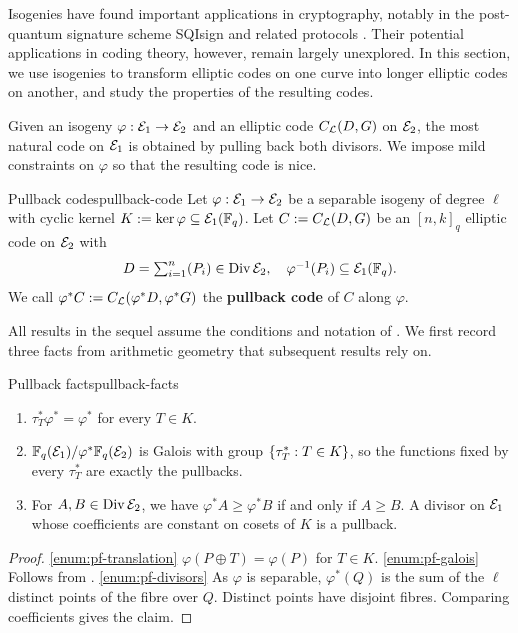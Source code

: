 \documentclass[twocolumn, 11pt]{scrartcl}
\begin{document}
Isogenies have found important applications in cryptography, notably in the post-quantum signature scheme SQIsign \cite{NISTPQC-ADD-R3:SQIsign26} and related protocols \cite{basso2026prism,jamielow2027}. Their potential applications in coding theory, however, remain largely unexplored. In this section, we use isogenies to transform elliptic codes on one curve into longer elliptic codes on another, and study the properties of the resulting codes.

Given an isogeny $\varphi:\mathcal{E}_1\to\mathcal{E}_2$ and an elliptic code $C_\mathcal{L}(D,G)$ on $\mathcal{E}_2$, the most natural code on $\mathcal{E}_1$ is obtained by pulling back both divisors. We impose mild constraints on $\varphi$ so that the resulting code is nice.

\begin{definition}{Pullback codes}{pullback-code}
    Let $\varphi:\mathcal{E}_1\to\mathcal{E}_2$ be a separable isogeny of degree $\ell$ with cyclic kernel $K:=\ker\varphi\subseteq\mathcal{E}_1(\mathbb{F}_q)$. Let $C:=C_\mathcal{L}(D,G)$ be an $[n,k]_q$ elliptic code on $\mathcal{E}_2$ with
    \[ \textstyle D=\sum_{i=1}^n (P_i)\in\operatorname{Div}\mathcal{E}_2,\quad \varphi^{-1}(P_i)\subseteq\mathcal{E}_1(\mathbb{F}_q). \]
    We call $\varphi^*C:=C_\mathcal{L}(\varphi^*D,\varphi^*G)$ the \textbf{pullback code} of $C$ along $\varphi$.
\end{definition}

All results in the sequel assume the conditions and notation of . We first record three facts from arithmetic geometry that subsequent results rely on.

\begin{lemma}{Pullback facts}{pullback-facts}
    \begin{enumerate}
        \item \label{enum:pf-translation} $\tau_T^*\varphi^*=\varphi^*$ for every $T\in K$.
        \item \label{enum:pf-galois} $\mathbb{F}_q(\mathcal{E}_1)/\varphi^*\mathbb{F}_q(\mathcal{E}_2)$ is Galois with group $\{\tau_T^*:T\in K\}$, so the functions fixed by every $\tau_T^*$ are exactly the pullbacks.
        \item \label{enum:pf-divisors} For $A,B\in\operatorname{Div}\mathcal{E}_2$, we have $\varphi^*A\geq\varphi^*B$ if and only if $A\geq B$. A divisor on $\mathcal{E}_1$ whose coefficients are constant on cosets of $K$ is a pullback.
    \end{enumerate}
\end{lemma}

\begin{proof}
\ref{enum:pf-translation} $\varphi(P\oplus T)=\varphi(P)$ for $T\in K$.
\ref{enum:pf-galois} Follows from \cite[Thm.~III.4.10]{silverman2009arithmetic}.
\ref{enum:pf-divisors} As $\varphi$ is separable, $\varphi^*(Q)$ is the sum of the $\ell$ distinct points of the fibre over $Q$. Distinct points have disjoint fibres. Comparing coefficients gives the claim.
\end{proof}
\end{document}
